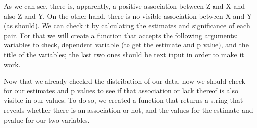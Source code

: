 \documentclass{article}
\begin{document}
As we can see, there is, apparently, a positive association between Z and X and also Z and Y. On the other hand, there is no visible association between X and Y  (as should). We can check it by calculating the estimates and significance of each pair. For that we will create a function that accepts the following  arguments: variables to check, dependent variable (to get the estimate and p value), and the title of the variables; the last two ones should be text input in order to make it work.\par
Now that we already checked the distribution of our data, now we should check for our estimates and p values to see if that association or lack thereof is also visible in our values. To do so, we created a function that returns a string that reveals whether there is an association or not, and the values for the estimate and pvalue for our two variables.\par
\end{document}

